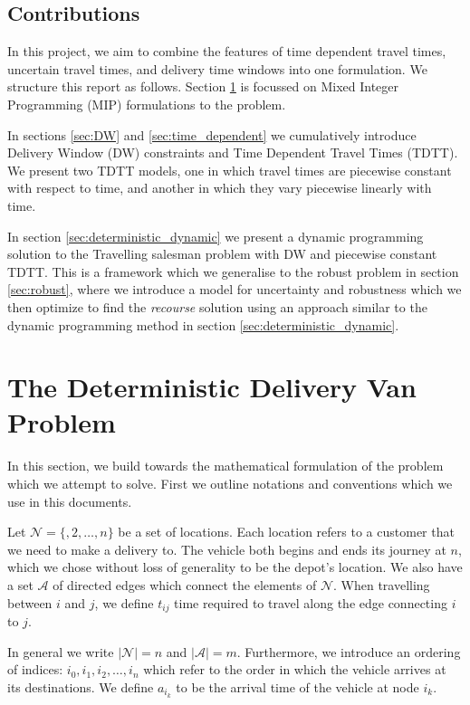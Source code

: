 \subsection{Contributions}
In this project, we aim to combine the features of time dependent travel times, uncertain travel times, and delivery time windows into one formulation. We structure this report as follows. Section \ref{sec:deterministic} is focussed on Mixed Integer Programming (MIP) formulations to the problem. 

In sections \ref{sec:DW} and \ref{sec:time_dependent} we cumulatively introduce Delivery Window (DW) constraints and Time Dependent Travel Times (TDTT). We present two TDTT models, one in which travel times are piecewise constant with respect to time, and another in which they vary piecewise linearly with time.

In section \ref{sec:deterministic_dynamic} we present a dynamic programming solution to the Travelling salesman problem with DW and piecewise constant TDTT. This is a framework which we generalise to the robust problem in section \ref{sec:robust}, where we introduce a model for uncertainty and robustness which we then optimize to find the \textit{recourse} solution using an approach similar to the dynamic programming method in section \ref{sec:deterministic_dynamic}.

\section{The Deterministic Delivery Van Problem}
\label{sec:deterministic}
In this section, we build towards the mathematical formulation of the problem which we attempt to solve. First we outline notations and conventions which we use in this documents. 

Let $\mathcal{N} = \{, 2, \ldots, n\}$ be a set of locations. Each location refers to a customer that we need to make a delivery to. The vehicle both begins and ends its journey at $n$, which we chose without loss of generality to be the depot's location. We also have a set $\mathcal{A}$ of directed edges which connect the elements of $\mathcal{N}$. When travelling between $i$ and $j$, we define $t_{ij}$ time required to travel along the edge connecting $i$ to $j$. 

In general we write $|\mathcal{N}| = n$ and $|\mathcal{A}| = m$. Furthermore, we introduce an ordering of indices: $i_0, i_1, i_2, \ldots, i_n$ which refer to the order in which the vehicle arrives at its destinations. We define $a_{i_k}$ to be the arrival time of the vehicle at node $i_k$. 

